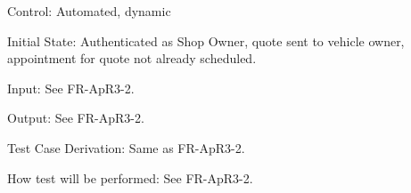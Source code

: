 \documentclass[12pt, titlepage]{article}
\begin{document}
\begin{enumerate}
                Control: Automated, dynamic \par
                Initial State: Authenticated as Shop Owner, quote sent to vehicle owner, appointment for quote not already scheduled. \par
                Input: See FR-ApR3-2. \par
                Output: See FR-ApR3-2. \par
                Test Case Derivation: Same as FR-ApR3-2. \par
                How test will be performed: See FR-ApR3-2.
        \end{enumerate}
\end{document}
